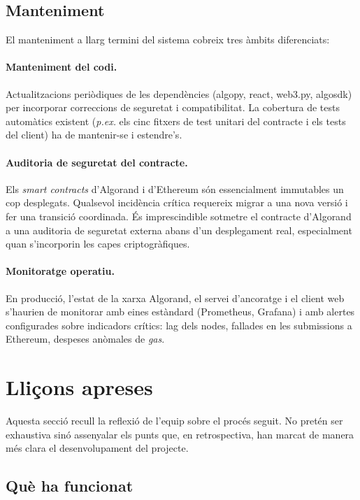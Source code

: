 \subsection{Manteniment}

El manteniment a llarg termini del sistema cobreix tres àmbits
diferenciats:

\paragraph{Manteniment del codi.} Actualitzacions periòdiques de les
dependències (algopy, react, web3.py, algosdk) per incorporar
correccions de seguretat i compatibilitat. La cobertura de tests
automàtics existent (\emph{p.ex.} els cinc fitxers de test unitari
del contracte i els tests del client) ha de mantenir-se i estendre's.

\paragraph{Auditoria de seguretat del contracte.} Els \emph{smart
contracts} d'Algorand i d'Ethereum són essencialment immutables un
cop desplegats. Qualsevol incidència crítica requereix migrar a una
nova versió i fer una transició coordinada. És imprescindible
sotmetre el contracte d'Algorand a una auditoria de seguretat
externa abans d'un desplegament real, especialment quan
s'incorporin les capes criptogràfiques.

\paragraph{Monitoratge operatiu.} En producció, l'estat de la xarxa
Algorand, el servei d'ancoratge i el client web s'haurien de
monitorar amb eines estàndard (Prometheus, Grafana) i amb alertes
configurades sobre indicadors crítics: lag dels nodes, fallades en
les submissions a Ethereum, despeses anòmales de \emph{gas}.

\section{Lliçons apreses}
\label{sec:llicons}

Aquesta secció recull la reflexió de l'equip sobre el procés
seguit. No pretén ser exhaustiva sinó assenyalar els punts que, en
retrospectiva, han marcat de manera més clara el desenvolupament del
projecte.

\subsection{Què ha funcionat}

